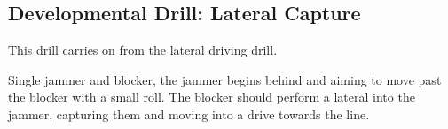 \subsection*{Developmental Drill: Lateral Capture}
\label{drill:one_on_one/developmental/lateral_capture}

This drill carries on from the lateral driving drill.


Single jammer and blocker, the jammer begins behind and aiming to move past the blocker with a small roll.
The blocker should perform a lateral into the jammer, capturing them and moving into a drive towards the line. 




